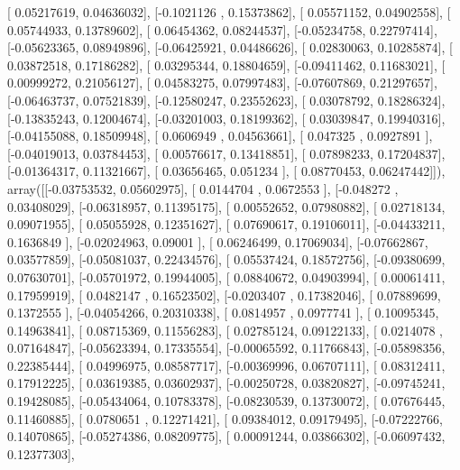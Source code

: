 \documentclass{article}
\begin{document}
       [ 0.05217619,  0.04636032],
       [-0.1021126 ,  0.15373862],
       [ 0.05571152,  0.04902558],
       [ 0.05744933,  0.13789602],
       [ 0.06454362,  0.08244537],
       [-0.05234758,  0.22797414],
       [-0.05623365,  0.08949896],
       [-0.06425921,  0.04486626],
       [ 0.02830063,  0.10285874],
       [ 0.03872518,  0.17186282],
       [ 0.03295344,  0.18804659],
       [-0.09411462,  0.11683021],
       [ 0.00999272,  0.21056127],
       [ 0.04583275,  0.07997483],
       [-0.07607869,  0.21297657],
       [-0.06463737,  0.07521839],
       [-0.12580247,  0.23552623],
       [ 0.03078792,  0.18286324],
       [-0.13835243,  0.12004674],
       [-0.03201003,  0.18199362],
       [ 0.03039847,  0.19940316],
       [-0.04155088,  0.18509948],
       [ 0.0606949 ,  0.04563661],
       [ 0.047325  ,  0.0927891 ],
       [-0.04019013,  0.03784453],
       [ 0.00576617,  0.13418851],
       [ 0.07898233,  0.17204837],
       [-0.01364317,  0.11321667],
       [ 0.03656465,  0.051234  ],
       [ 0.08770453,  0.06247442]]), array([[-0.03753532,  0.05602975],
       [ 0.0144704 ,  0.0672553 ],
       [-0.048272  ,  0.03408029],
       [-0.06318957,  0.11395175],
       [ 0.00552652,  0.07980882],
       [ 0.02718134,  0.09071955],
       [ 0.05055928,  0.12351627],
       [ 0.07690617,  0.19106011],
       [-0.04433211,  0.1636849 ],
       [-0.02024963,  0.09001   ],
       [ 0.06246499,  0.17069034],
       [-0.07662867,  0.03577859],
       [-0.05081037,  0.22434576],
       [ 0.05537424,  0.18572756],
       [-0.09380699,  0.07630701],
       [-0.05701972,  0.19944005],
       [ 0.08840672,  0.04903994],
       [ 0.00061411,  0.17959919],
       [ 0.0482147 ,  0.16523502],
       [-0.0203407 ,  0.17382046],
       [ 0.07889699,  0.1372555 ],
       [-0.04054266,  0.20310338],
       [ 0.0814957 ,  0.0977741 ],
       [ 0.10095345,  0.14963841],
       [ 0.08715369,  0.11556283],
       [ 0.02785124,  0.09122133],
       [ 0.0214078 ,  0.07164847],
       [-0.05623394,  0.17335554],
       [-0.00065592,  0.11766843],
       [-0.05898356,  0.22385444],
       [ 0.04996975,  0.08587717],
       [-0.00369996,  0.06707111],
       [ 0.08312411,  0.17912225],
       [ 0.03619385,  0.03602937],
       [-0.00250728,  0.03820827],
       [-0.09745241,  0.19428085],
       [-0.05434064,  0.10783378],
       [-0.08230539,  0.13730072],
       [ 0.07676445,  0.11460885],
       [ 0.0780651 ,  0.12271421],
       [ 0.09384012,  0.09179495],
       [-0.07222766,  0.14070865],
       [-0.05274386,  0.08209775],
       [ 0.00091244,  0.03866302],
       [-0.06097432,  0.12377303],
\end{document}
